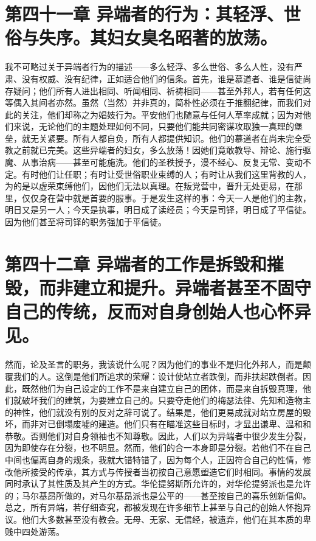 
\section{第四十一章 异端者的行为：其轻浮、世俗与失序。其妇女臭名昭著的放荡。}

我不可略过关于异端者行为的描述——多么轻浮、多么世俗、多么人性，没有严肃、没有权威、没有纪律，正如适合他们的信条。首先，谁是慕道者、谁是信徒尚存疑问；他们所有人进出相同、听闻相同、祈祷相同——甚至外邦人，若有任何这等偶入其间者亦然。虽然（当然）并非真的，简朴性必须在于推翻纪律，而我们对此的关注，他们却称之为娼妓行为。平安他们也随意与任何人草率成就；因为对他们来说，无论他们的主题处理如何不同，只要他们能共同密谋攻取独一真理的堡垒，就无关紧要。所有人都自负，所有人都提供知识。他们的慕道者在尚未完全受教之前就已完美。这些异端者的妇女，多么放荡！因她们竟敢教导、辩论、施行驱魔、从事治病——甚至可能施洗。他们的圣秩授予，漫不经心、反复无常、变动不定。有时他们让任职；有时让受世俗职业束缚的人；有时让从我们这里背教的人，为的是以虚荣束缚他们，因他们无法以真理。在叛党营中，晋升无处更易，在那里，仅仅身在营中就是首要的服事。于是发生这样的事：今天一人是他们的主教，明日又是另一人；今天是执事，明日成了读经员；今天是司铎，明日成了平信徒。因为他们甚至将司铎的职务强加于平信徒。\par


\section{第四十二章 异端者的工作是拆毁和摧毁，而非建立和提升。异端者甚至不固守自己的传统，反而对自身创始人也心怀异见。}

然而，论及圣言的职务，我该说什么呢？因为他们的事业不是归化外邦人，而是颠覆我们的人。这倒是他们所追求的荣耀：设计使站立者跌倒，而非扶起跌倒者。因此，既然他们为自己设定的工作不是来自建立自己的团体，而是来自拆毁真理，他们就破坏我们的建筑，为要建立自己的。只要夺走他们的梅瑟法律、先知和造物主的神性，他们就没有别的反对之辞可说了。结果是，他们更易成就对站立房屋的毁坏，而非对已倒塌废墟的建造。他们只有在瞄准这些目标时，才显出谦卑、温和和恭敬。否则他们对自身领袖也不知尊敬。因此，人们以为异端者中很少发生分裂，因为即使存在分裂，也不明显。然而，他们的合一本身即是分裂。若他们不在自己中间也偏离自身的规条，我就大错特错了，因为每个人，正因符合自己的性情，修改他所接受的传承，其方式与传授者当初按自己意愿塑造它们时相同。事情的发展同时承认了其性质及其产生的方式。华伦提努斯所允许的，对华伦提努派也是允许的；马尔基昂所做的，对马尔基昂派也是公平的——甚至按自己的喜乐创新信仰。总之，所有异端，若仔细查究，都被发现在许多细节上甚至与自己的创始人怀抱异议。他们大多数甚至没有教会。无母、无家、无信经，被遗弃，他们在其本质的卑贱中四处游荡。\par

